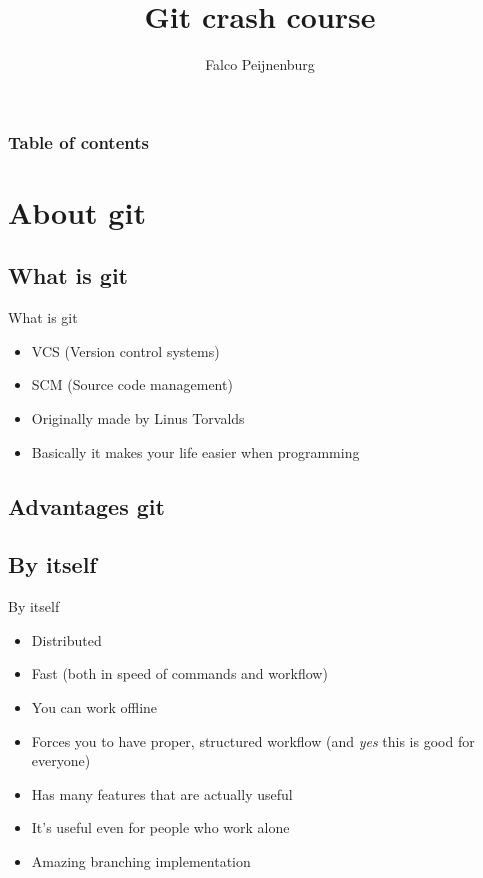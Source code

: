 \documentclass[10pt,a4paper]{beamer}
\author{Falco Peijnenburg}
\title[Git crash course\hspace{40mm} \insertframenumber/\inserttotalframenumber]{Git crash course}
\begin{document}
\frame{\titlepage}

\setcounter{tocdepth}{1}
\begin{frame}
\frametitle{Table of contents}
\tableofcontents[]
\end{frame}


\section{About git}
\subsection{What is git}
\begin{frame}{What is git}
\begin{itemize}
\item VCS (Version control systems)
\item SCM (Source code management)
\item Originally made by Linus Torvalds
\item Basically it makes your life easier when programming
\end{itemize}
\end{frame}

\subsection{Advantages git}

\subsection{By itself}
\begin{frame}{By itself}
\begin{itemize}
\item Distributed
\item Fast (both in speed of commands and workflow)
\item You can work offline
\item Forces you to have proper, structured workflow (and \textit{yes} this is good for everyone)
\item Has many features that are actually useful
\item It's useful even for people who work alone
\item Amazing branching implementation

\end{itemize}
\end{frame}
\end{document}
